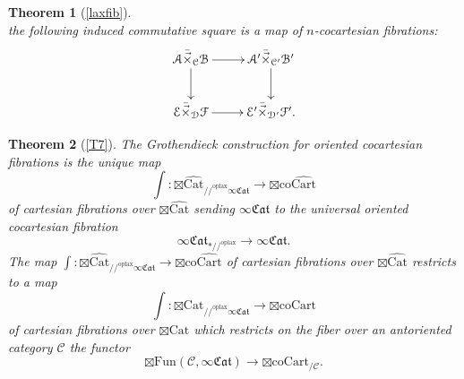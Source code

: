 \documentclass[10pt,oneside]{article}
\numberwithin{equation}{section} %
\numberwithin{figure}{section} %
\theoremstyle{plain}
\newtheorem{theorem}{Theorem}[subsection]
\theoremstyle{definition}
\newcommand{\mA}{{\mathcal A}}
\newcommand{\mB}{{\mathcal B}}
\newcommand{\mC}{{\mathcal C}}
\newcommand{\mD}{{\mathcal D}}
\newcommand{\mE}{{\mathcal E}}
\newcommand{\mF}{{\mathcal F}}
\newcommand{\co}{\mathrm{co}}
\newcommand{\Cat}{\mathrm{Cat}}
\newcommand{\Fun}{\mathrm{Fun}}
\newcommand{\coCart}{{\mathrm{coCart}}}
\newcommand{\Cart}{{\mathrm{Cart}}}
\newcommand{\oplax}{{\mathrm{oplax}}}
\newcommand{\fcat}{\mathfrak{Cat}}
\begin{document}
\begin{theorem}[{\cref{laxfib}}]
\qquad\qquad\qquad{}\qquad\qquad
{}\\
the following induced commutative square is a map of $n$-cocartesian fibrations:
\begin{equation*}
\xymatrix{
\mA {\bar{\vec{\times}}}_{\mC} \mB \ar[r] \ar[d] & \mA' {\bar{\vec{\times}}}_{\mC'} \mB' \ar[d] \\
\mE {\bar{\vec{\times}}}_{\mD} \mF \ar[r] & \mE' {\bar{\vec{\times}}}_{\mD'} \mF'.
}\end{equation*}
\end{theorem}


\begin{theorem}[{\cref{T7}}]
    The Grothendieck construction for oriented cocartesian fibrations is the unique map 
$$\int: {\boxtimes\widehat{\Cat}}_{//^\oplax\infty\fcat} \to {\boxtimes\co\widehat{\Cart}}$$
of cartesian fibrations over $\boxtimes\widehat{\Cat}$ sending $\infty\fcat$ to the universal oriented cocartesian fibration $$ \infty\fcat_{*//^\oplax} \to \infty\fcat.$$
The map $\int: {\boxtimes\widehat{\Cat}}_{//^\oplax\infty\fcat} \to {\boxtimes\co\widehat{\Cart}}$ of cartesian fibrations over
$\boxtimes\widehat{\Cat}$
restricts to a map 
\begin{equation*}
\int: {\boxtimes\Cat}_{//^\oplax\infty\fcat} \to {\boxtimes\coCart}
\end{equation*}
of cartesian fibrations over $\boxtimes\Cat$ which restricts on the fiber over an antoriented category $ \mC $
the functor $$ \boxtimes\Fun(\mC, \infty\fcat) \to {\boxtimes\coCart}_{/\mC}.$$

\end{theorem}
\end{document}
